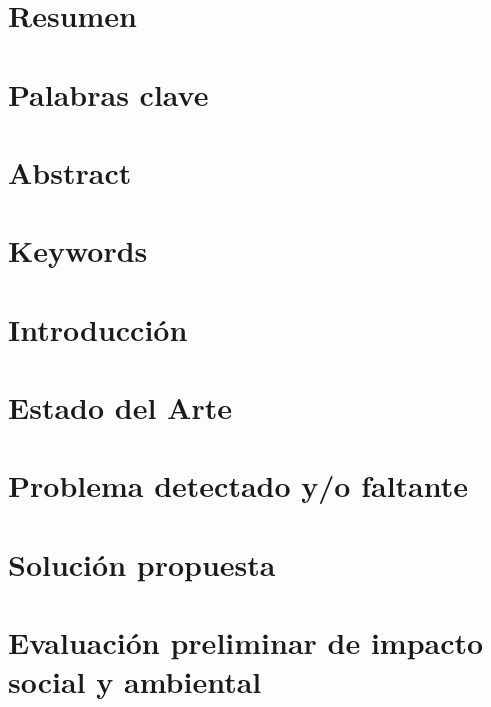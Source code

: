 \documentclass[a4paper,11pt]{article}
\begin{document}


\tableofcontents
\newpage

\section{Resumen}

\newpage

\section{Palabras clave}

\newpage

\section{Abstract}

\newpage

\section{Keywords}

\newpage

\section{Introducción}

\newpage

\section{Estado del Arte}

\newpage

\section{Problema detectado y/o faltante}

\newpage

\section{Solución propuesta}

\newpage

\section{Evaluación preliminar de impacto social y ambiental}

\newpage
\end{document}
